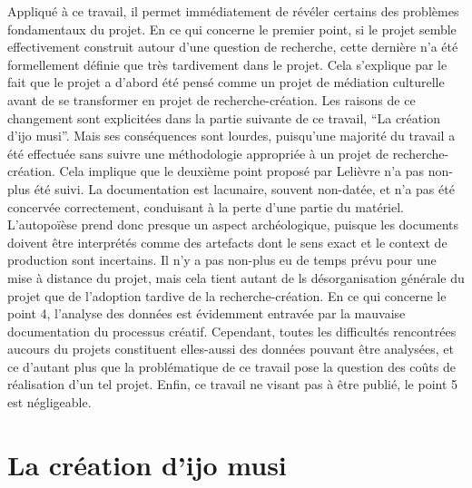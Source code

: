 \documentclass{scrartcl}
\begin{document}
	Appliqué à ce travail, il permet immédiatement de révéler certains des problèmes fondamentaux du projet. En ce qui concerne le premier point, si le projet semble effectivement construit autour d'une question de recherche, cette dernière n'a été formellement définie que très tardivement dans le projet. Cela s'explique par le fait que le projet a d'abord été pensé comme un projet de médiation culturelle avant de se transformer en projet de recherche-création. Les raisons de ce changement sont explicitées dans la partie suivante de ce travail, “La création d'ijo musi”. Mais ses conséquences sont lourdes, puisqu'une majorité du travail a été effectuée sans suivre une méthodologie appropriée à un projet de recherche-création. Cela implique que le deuxième point proposé par Lelièvre n'a pas non-plus été suivi. La documentation est lacunaire, souvent non-datée, et n'a pas été concervée correctement, conduisant à la perte d'une partie du matériel. L'autopoïèse prend donc presque un aspect archéologique, puisque les documents doivent être interprétés comme des artefacts dont le sens exact et le context de production sont incertains. Il n'y a pas non-plus eu de temps prévu pour une mise à distance du projet, mais cela tient autant de ls désorganisation générale du projet que de l'adoption tardive de la recherche-création. En ce qui concerne le point 4, l'analyse des données est évidemment entravée par la mauvaise documentation du processus créatif. Cependant, toutes les difficultés rencontrées aucours du projets constituent elles-aussi des données pouvant être analysées, et ce d'autant plus que la problématique de ce travail pose la question des coûts de réalisation d'un tel projet. Enfin, ce travail ne visant pas à être publié, le point 5 est négligeable.\\
	
	\section{La création d'ijo musi}
\end{document}
